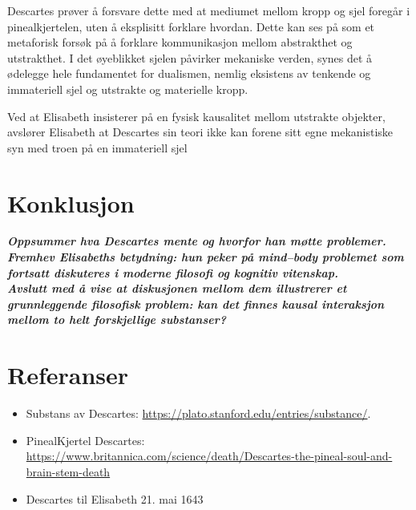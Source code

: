 \documentclass[12pt, a4paper]{article}
\begin{document}
Descartes prøver å forsvare dette med at mediumet mellom kropp og sjel foregår i pinealkjertelen, uten å eksplisitt forklare hvordan. Dette kan ses på som et metaforisk forsøk på å forklare kommunikasjon mellom abstrakthet og utstrakthet. I det øyeblikket sjelen påvirker mekaniske verden, synes det å ødelegge hele fundamentet for dualismen, nemlig eksistens av tenkende og immateriell sjel og utstrakte og materielle kropp.

Ved at Elisabeth insisterer på en fysisk kausalitet mellom utstrakte objekter, avslører Elisabeth at Descartes sin teori ikke kan forene sitt egne mekanistiske syn med troen på en immateriell sjel

\section{Konklusjon}

\textbf{\textit{Oppsummer hva Descartes mente og hvorfor han møtte problemer.\\
Fremhev Elisabeths betydning: hun peker på mind–body problemet som fortsatt diskuteres i moderne filosofi og kognitiv vitenskap.\\
Avslutt med å vise at diskusjonen mellom dem illustrerer et grunnleggende filosofisk problem: kan det finnes kausal interaksjon mellom to helt forskjellige substanser?}}

\section{Referanser}


\begin{itemize}
    \item Substans av Descartes: \url{https://plato.stanford.edu/entries/substance/}.
    \item PinealKjertel Descartes: \url{https://www.britannica.com/science/death/Descartes-the-pineal-soul-and-brain-stem-death}
    \item Descartes til Elisabeth 21. mai 1643 
\end{itemize}
\end{document}
